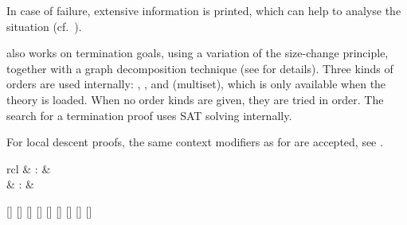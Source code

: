 \begin{isabellebody}
\begin{isamarkuptext}
\begin{description}
  In case of failure, extensive information is printed, which can help
  to analyse the situation (cf.\ \cite{isabelle-function}).

  \item \hyperlink{method.HOL.size-change}{\mbox{}} also works on termination goals,
  using a variation of the size-change principle, together with a
  graph decomposition technique (see \cite{krauss_phd} for details).
  Three kinds of orders are used internally: , ,
  and  (multiset), which is only available when the theory
   is loaded. When no order kinds are given, they are
  tried in order. The search for a termination proof uses SAT solving
  internally.

 For local descent proofs, the same context modifiers as for \hyperlink{method.auto}{\mbox{}} are accepted, see .

  \end{description}%
\end{isamarkuptext}%
\isamarkuptrue%
%
\isamarkuptrue%
%
\begin{isamarkuptext}%
\begin{matharray}{rcl}
    \hypertarget{command.HOL.partial-function}{\hyperlink{command.HOL.partial-function}{\mbox{}}} & : &  \\
    \hypertarget{attribute.HOL.partial-function-mono}{\hyperlink{attribute.HOL.partial-function-mono}{\mbox{}}} & : &  \\
  \end{matharray}

  \begin{railoutput}
[]
\rail@bar
{}
[]
\rail@endbar
{}[]
[]
[]
[]
[]
\rail@bar
{}
[]
\rail@endbar
{}[]
\rail@end
\end{railoutput}



\end{isamarkuptext}
\end{isabellebody}
